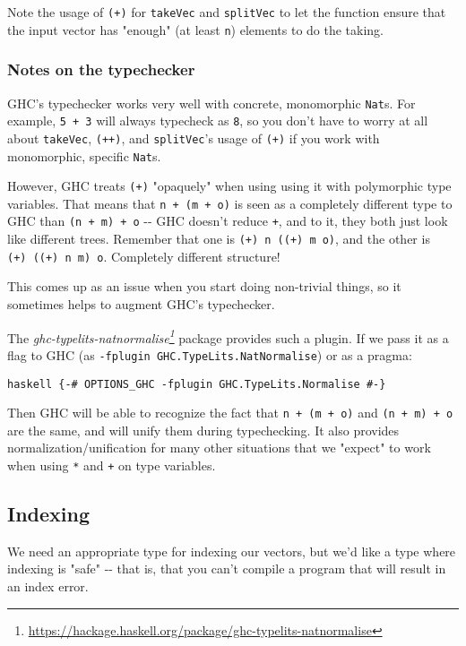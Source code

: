 \documentclass[]{article}
\renewcommand{\href}[2]{#2\footnote{\url{#1}}}
\begin{document}
Note the usage of \texttt{(+)} for \texttt{takeVec} and \texttt{splitVec} to let
the function ensure that the input vector has "enough" (at least \texttt{n})
elements to do the taking.

\subsubsection{Notes on the typechecker}

GHC's typechecker works very well with concrete, monomorphic \texttt{Nat}s. For
example, \texttt{5\ +\ 3} will always typecheck as \texttt{8}, so you don't have
to worry at all about \texttt{takeVec}, \texttt{(++)}, and \texttt{splitVec}'s
usage of \texttt{(+)} if you work with monomorphic, specific \texttt{Nat}s.

However, GHC treats \texttt{(+)} "opaquely" when using using it with polymorphic
type variables. That means that \texttt{n\ +\ (m\ +\ o)} is seen as a completely
different type to GHC than \texttt{(n\ +\ m)\ +\ o} -\/- GHC doesn't reduce
\texttt{+}, and to it, they both just look like different trees. Remember that
one is \texttt{(+)\ n\ ((+)\ m\ o)}, and the other is
\texttt{(+)\ ((+)\ n\ m)\ o}. Completely different structure!

This comes up as an issue when you start doing non-trivial things, so it
sometimes helps to augment GHC's typechecker.

The
\emph{\href{https://hackage.haskell.org/package/ghc-typelits-natnormalise}{ghc-typelits-natnormalise}}
package provides such a plugin. If we pass it as a flag to GHC (as
\texttt{-fplugin\ GHC.TypeLits.NatNormalise}) or as a pragma:

\texttt{haskell\ \{-\#\ OPTIONS\_GHC\ -fplugin\ GHC.TypeLits.Normalise\ \#-\}}

Then GHC will be able to recognize the fact that \texttt{n\ +\ (m\ +\ o)} and
\texttt{(n\ +\ m)\ +\ o} are the same, and will unify them during typechecking.
It also provides normalization/unification for many other situations that we
"expect" to work when using \texttt{*} and \texttt{+} on type variables.

\subsection{Indexing}

We need an appropriate type for indexing our vectors, but we'd like a type where
indexing is "safe" -\/- that is, that you can't compile a program that will
result in an index error.
\end{document}
